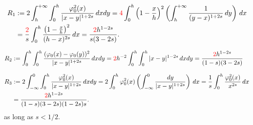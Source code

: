 \documentclass[10 pt]{article}
\numberwithin{equation}{section}
\newcommand{\B}[1]{{\color{red} #1}}  %
\begin{document}

\begin{align*}
	R_1 &:= 2\int_{h}^{+\infty}\int_{0}^{h} \frac{\varphi_0^2(x)}{|x-y|^{1+2s}}\,dxdy = \B{4}\int_{0}^{h}\left(1-\frac{x}{h}\right)^2\left(\int_{h}^{+\infty} \frac{1}{(y-x)^{1+2s}}\, dy\right)\,dx \\
	&= \frac{\B{2}}{s}\int_{0}^{h}\frac{\left(1-\frac{x}{h}\right)^2}{(h-x)^{2s}}\,dx
	=\frac{\B{2}h^{1-2 s}}{s(3-2 s)}.
\end{align*}

\begin{align*}
	R_2 &
	:= \int_{0}^{h}\int_{0}^{h} \frac{(\varphi_0(x)-\varphi_0(y))^2}{|x-y|^{1+2s}}\,dxdy
	= \B{2}h^{-2}\int_{0}^{h}\int_{0}^{h} |x-y|^{1-2s}\,dxdy
	=\frac{\B{2}h^{1-2 s}}{(1-s) (3-2 s)}
\end{align*}



\begin{align*}
	R_3 &:= 2\int_{-\infty}^{0}\int_{0}^{h} \frac{\varphi_0^2(x)}{|x-y|^{1+2s}}\,dxdy = 2\int_{0}^{h}\varphi_0^2(x)\left(\int_{-\infty}^{0} \frac{dy}{|x-y|^{1+2s}}\right)\,dx = \frac{1}{s}\int_{0}^{h}\frac{\varphi_0^2(x)}{x^{2s}}\,dx\\
	&=\frac{\B{2}h^{1-2 s}}{(1-s)(3-2 s) (1-2 s)s}.
\end{align*}
%
as long as $s<1/2$.
\end{document}
